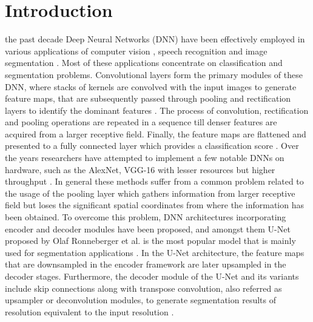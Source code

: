 \documentclass[journal]{IEEEtran}
\begin{document}
\section{Introduction}\label{sec:introduction}
 the past decade Deep Neural Networks (DNN) have been effectively employed in various applications of computer vision \citep{2019DT,inproceedings12}, speech recognition \citep{inproceedings9} and image segmentation \citep{inproceedings5}. Most of these applications concentrate on classification and segmentation problems.  Convolutional layers form the primary modules of these DNN, where stacks of kernels are convolved with the input images to generate feature maps, that are subsequently passed through pooling and rectification layers to identify the dominant features  \citep{article10}. The process of convolution,    rectification and pooling operations are repeated in a sequence till denser features are acquired from a larger receptive field. Finally, the feature maps are flattened and presented to a fully connected layer which provides a classification score  \citep{inproceedings11}. Over the years researchers have attempted to implement a few notable DNNs on hardware, such as the AlexNet, VGG-16 \citep{inproceedings8} with lesser resources but higher throughput \citep{inproceedings2,article3,inproceedings8}.
In general these methods suffer from a common problem related to the usage of the pooling layer which gathers information from larger receptive field but loses the significant spatial coordinates from where the information has been obtained. To overcome this problem, DNN architectures incorporating encoder and decoder modules have been proposed, and amongst them U-Net proposed by Olaf Ronneberger et al. is the most popular model that is mainly used for segmentation applications \cite{inproceedings5}. In the U-Net architecture, the  feature maps that are downsampled in the encoder framework are later  upsampled in the decoder stages. Furthermore, the decoder module of the U-Net and its variants include skip connections along with transpose convolution, also referred as upsampler or deconvolution modules, to generate segmentation results of resolution equivalent to the input resolution \cite{inproceedings5}. 
\end{document}
